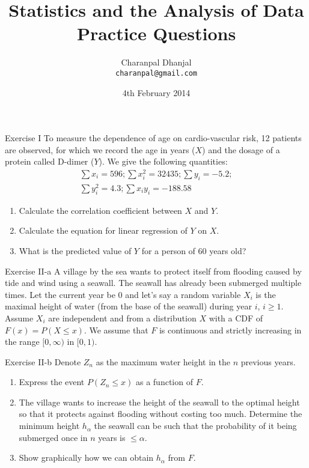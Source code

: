 \documentclass{beamer}
\title{Statistics and the Analysis of Data\\ Practice Questions}
\author{Charanpal Dhanjal \\ \texttt{charanpal@gmail.com}}
\institute{\'{E}cole des Ponts}
\date{4th February 2014}
\begin{document}
\frame{\titlepage}


\begin{frame}{Exercise I}
To measure the dependence of age on cardio-vascular risk, 12 patients are observed, for which we record the age in years ($X$) and the dosage of a protein called D-dimer ($Y$). We give the following quantities: 
\begin{eqnarray*}
\sum x_i =596; \sum x_i^2 = 32435; \sum y_i = -5.2; \\ 
 \sum y_i^2 = 4.3; \sum x_i y_i = -188.58  
\end{eqnarray*}
\begin{enumerate} 
 \item Calculate the correlation coefficient between $X$ and $Y$. 
 \item Calculate the equation for linear regression of $Y$ on $X$. 
 \item What is the predicted value of $Y$ for a person of 60 years old? 
\end{enumerate}
\end{frame}

\begin{frame}{Exercise II-a}
A village by the sea wants to protect itself from flooding caused by tide and wind using a seawall. The seawall has already been submerged multiple times.  Let the current year be $0$ and let's say a random variable $X_i$ is the maximal height of water (from the base of the seawall) during year $i$, $i \geq 1$. Assume $X_i$ are independent and from a distribution $X$ with a CDF of $F(x) = P(X \leq x)$. We assume that $F$ is continuous and strictly increasing in the range $[0, \infty)$ in $[0, 1)$. 
\end{frame}

\begin{frame}{Exercise II-b} 
Denote $Z_n$ as the maximum water height in the $n$ previous years. 
\begin{enumerate}
 \item Express the event $P(Z_n \leq x)$ as a function of $F$. 
 \item The village wants to increase the height of the seawall to the optimal height so that it protects against flooding without costing too much. Determine the minimum height $h_\alpha$ the seawall can be such that the probability of it being submerged once in $n$ years is $\leq \alpha$.  
 \item Show graphically how we can obtain $h_\alpha$ from $F$. 
\end{enumerate}
\end{frame}
\end{document}
